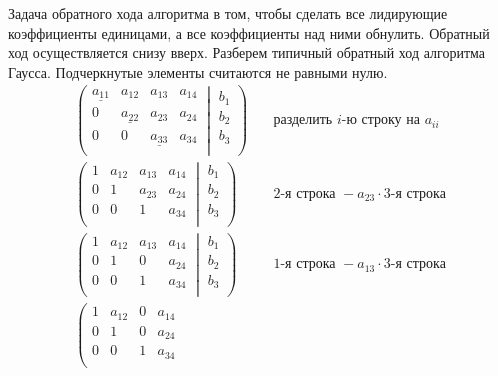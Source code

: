 Задача обратного хода алгоритма в том, чтобы сделать все лидирующие коэффициенты единицами, а все коэффициенты над ними обнулить.
Обратный ход осуществляется снизу вверх.
Разберем типичный обратный ход алгоритма Гаусса.
Подчеркнутые элементы считаются не равными нулю.
\begin{align*}
\left(\left.
\begin{matrix}
\underline{a_{11}}& a_{12}&a_{13}& a_{14}\\
0& \underline{a_{22}}&a_{23}& a_{24}\\
0& 0&\underline{a_{33}}& a_{34}\\
\end{matrix}
\:\right|\:
\begin{matrix}
b_1\\
b_2\\
b_3\\
\end{matrix}
\right)&
\quad \text{разделить }i\text{-ю строку на }a_{ii}\\
\left(\left.
\begin{matrix}
1& a_{12}&a_{13}& a_{14}\\
0& 1&a_{23}& a_{24}\\
0& 0&1& a_{34}\\
\end{matrix}
\:\right|\:
\begin{matrix}
b_1\\
b_2\\
b_3\\
\end{matrix}
\right)&
\quad 2\text{-я строка }-a_{23}\cdot3\text{-я строка}\\
\left(\left.
\begin{matrix}
1& a_{12}&a_{13}& a_{14}\\
0& 1&0& a_{24}\\
0& 0&1& a_{34}\\
\end{matrix}
\:\right|\:
\begin{matrix}
b_1\\
b_2\\
b_3\\
\end{matrix}
\right)&
\quad 1\text{-я строка }-a_{13}\cdot3\text{-я строка}\\
\left(\left.
\begin{matrix}
1& a_{12}&0& a_{14}\\
0& 1&0& a_{24}\\
0& 0&1& a_{34}\\

\end{matrix}
\end{align*}
